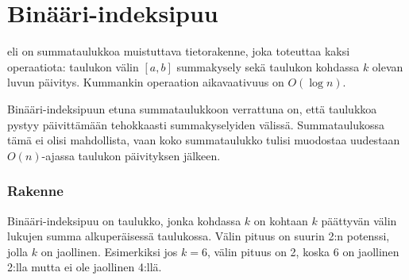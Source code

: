 \section{Binääri-indeksipuu}


 eli  on
summataulukkoa muistuttava tietorakenne,
joka toteuttaa kaksi operaatiota:
taulukon välin $[a,b]$ summakysely
sekä taulukon kohdassa $k$ olevan luvun päivitys.
Kummankin operaation aikavaativuus on $O(\log n)$.

Binääri-indeksipuun etuna summataulukkoon verrattuna on,
että taulukkoa pystyy päivittämään tehokkaasti
summakyselyiden välissä.
Summataulukossa tämä ei olisi mahdollista,
vaan koko summataulukko tulisi muodostaa uudestaan $O(n)$-ajassa
taulukon päivityksen jälkeen.

\subsubsection{Rakenne}

Binääri-indeksipuu on taulukko, jonka
kohdassa $k$ on kohtaan $k$ päättyvän välin lukujen summa
alkuperäisessä taulukossa.
Välin pituus on suurin 2:n potenssi, jolla $k$ on jaollinen.
Esimerkiksi jos $k=6$, välin pituus on 2, koska
6 on jaollinen 2:lla mutta ei ole jaollinen 4:llä.

